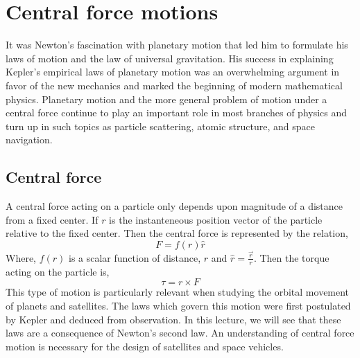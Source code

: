 \chapter{Central force motions}
It was Newton's fascination with planetary motion that led him to formulate his laws of motion and the law of universal gravitation. His success in explaining Kepler's empirical laws of planetary motion was an overwhelming argument in favor of the new mechanics and marked the beginning of modern mathematical physics. Planetary motion and the more general problem of motion under a central force continue to play an important role in most branches of physics and turn up in such topics as particle scattering, atomic structure, and space navigation.
\section{Central force}
A central force  acting on a particle only depends upon magnitude of a distance from a fixed center. If $r$ is the instanteneous position vector of the particle relative to the fixed center. Then the central force is represented by the relation,
\begin{equation}
F= f(r) \hat{r}
\end{equation}
Where, $f(r)$ is a scalar function of distance, $r$  and $\hat{r}=\frac{\vec{r}}{r}$. Then the torque acting on the particle is,
\begin{equation}
\tau =r\times F
\end{equation}
This type of motion is particularly relevant when studying the orbital movement of planets and satellites. The laws which govern this motion were first postulated by Kepler and deduced from observation. In this lecture, we will see that these laws are a consequence of Newton's second law. An understanding of central force motion is necessary for the design of satellites and space vehicles.
